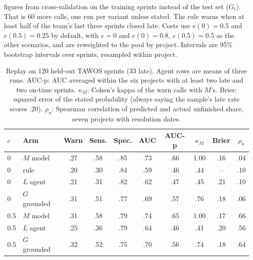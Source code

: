 \documentclass[conference]{IEEEtran}
\begin{document}
figures from cross-validation on the training sprints instead of the test set ($G_t$). That is 60 more calls, one run per variant unless stated. The rule warns when at least half of the team's last three sprints closed late. Costs use $e(0)=0.5$ and $e(0.5)=0.25$ by default, with $e=0$ and $e(0)=0.8$, $e(0.5)=0.5$ as the other scenarios, and are reweighted to the pool by project. Intervals are 95\% bootstrap intervals over sprints, resampled within project.

\begin{table}[t]
\centering\footnotesize
\caption{Replay on 120 held-out TAWOS sprints (33 late). Agent rows are means of three runs. AUC-p: AUC averaged within the six projects with at least two late and two on-time sprints. $\kappa_M$: Cohen's kappa of the warn calls with $M$'s. Brier: squared error of the stated probability (always saying the sample's late rate scores .20). $\rho_u$: Spearman correlation of predicted and actual unfinished share, seven projects with resolution dates.}
\label{tab:study}
\setlength{\tabcolsep}{2.4pt}
\begin{tabular}{llcccccccc}
\hline
$c$ & Arm & Warn & Sens. & Spec. & AUC & AUC-p & $\kappa_M$ & Brier & $\rho_u$\\
\hline
0 & $M$ model & .27 & .58 & .85 & .73 & .66 & 1.00 & .16 & .04\\
0 & rule & .20 & .30 & .84 & .59 & .46 & .44 & -- & .10\\
0 & $L$ agent & .21 & .31 & .82 & .62 & .47 & .45 & .21 & .10\\
0 & $G$ grounded & .31 & .51 & .77 & .69 & .57 & .76 & .18 & .06\\
0.5 & $M$ model & .31 & .58 & .79 & .74 & .65 & 1.00 & .17 & .66\\
0.5 & $L$ agent & .25 & .36 & .79 & .64 & .46 & .41 & .20 & .56\\
0.5 & $G$ grounded & .32 & .52 & .75 & .70 & .56 & .74 & .18 & .64\\
\hline
\end{tabular}
\end{table}
\end{document}
